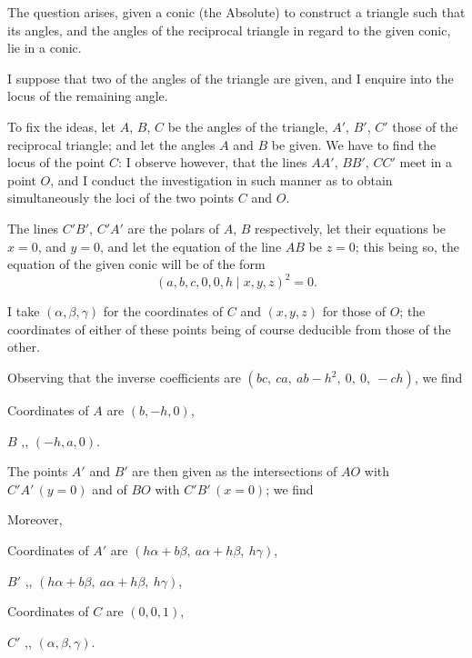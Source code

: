 \documentclass[11pt,a4paper]{article}
\theoremstyle{plain}
\begin{document}
\newpage
\setcounter{equation}{15}

The question arises, given a conic (the Absolute) to construct a triangle such that its angles, and the angles of the reciprocal triangle in regard to the given conic, lie in a conic.

I suppose that two of the angles of the triangle are given, and I enquire into the locus of the remaining angle.

To fix the ideas, let $A$, $B$, $C$ be the angles of the triangle, $A'$, $B'$, $C'$ those of the reciprocal triangle; and let the angles $A$ and $B$ be given. We have to find the locus of the point $C$: I observe however, that the lines $AA'$, $BB'$, $CC'$ meet in a point $O$, and I conduct the investigation in such manner as to obtain simultaneously the loci of the two points $C$ and $O$.

The lines $C'B'$, $C'A'$ are the polars of $A$, $B$ respectively, let their equations be $x = 0$, and $y = 0$, and let the equation of the line $AB$ be $z = 0$; this being so, the equation of the given conic will be of the form
\begin{equation}
(a, b, c, 0, 0, h \mid x, y, z)^2 = 0.
\end{equation}

I take $(\alpha, \beta, \gamma)$ for the coordinates of $C$ and $(x, y, z)$ for those of $O$; the coordinates of either of these points being of course deducible from those of the other.

Observing that the inverse coefficients are $(bc,\ ca,\ ab-h^2,\ 0,\ 0,\ -ch)$, we find

Coordinates of $A$ are $(b, -h, 0)$,

$B$ \hspace{2em} ,, \hspace{2em} $(-h, a, 0)$.

The points $A'$ and $B'$ are then given as the intersections of $AO$ with $C'A'\,(y=0)$ and of $BO$ with $C'B'\,(x=0)$; we find

Moreover,

Coordinates of $A'$ are $(h\alpha + b\beta,\ a\alpha + h\beta,\ h\gamma)$,

$B'$ \hspace{2em} ,, \hspace{2em} $(h\alpha + b\beta,\ a\alpha + h\beta,\ h\gamma)$,

Coordinates of $C$ are $(0, 0, 1)$,

$C'$ \hspace{2em} ,, \hspace{2em} $(\alpha, \beta, \gamma)$.
\end{document}
